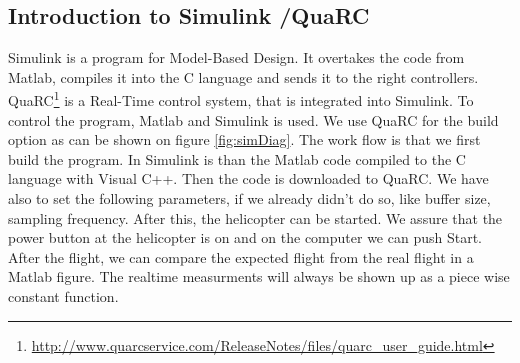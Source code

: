 \subsection{Introduction to Simulink /QuaRC}
Simulink is a program for Model-Based Design. It overtakes the code from Matlab, compiles it into the C language and sends it to the right controllers. QuaRC\footnote{\url{http://www.quarcservice.com/ReleaseNotes/files/quarc_user_guide.html}} is a Real-Time control system, that is integrated into Simulink. To control the program, Matlab and Simulink is used. We use QuaRC for the build option as can be shown on figure \ref{fig:simDiag}. 
The work flow is that we first build the program. In Simulink is than the Matlab code compiled to the C language with Visual C++. Then the code is downloaded to QuaRC. We have also to set the following parameters, if we already didn't do so, like buffer size, sampling frequency. After this, the helicopter can be started. We assure that the power button at the helicopter is on and on the computer we can push Start. After the flight, we can compare the expected flight from the real flight in a Matlab figure. The realtime measurments will always be shown up as a piece wise constant function. 
